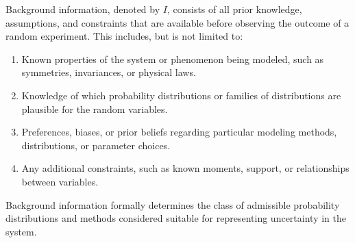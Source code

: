 \begin{definition}
	\label{def:background_information}
	Background information, denoted by $I$, consists of all prior knowledge, assumptions, and constraints that are available before observing the outcome of a random experiment. This includes, but is not limited to:
	\begin{enumerate}
		\item Known properties of the system or phenomenon being modeled, such as symmetries, invariances, or physical laws.
		\item Knowledge of which probability distributions or families of distributions are plausible for the random variables.
		\item Preferences, biases, or prior beliefs regarding particular modeling methods, distributions, or parameter choices.
		\item Any additional constraints, such as known moments, support, or relationships between variables.
	\end{enumerate}
	Background information formally determines the class of admissible probability distributions and methods considered suitable for representing uncertainty in the system.
\end{definition}

